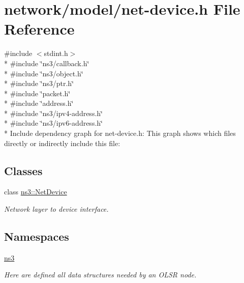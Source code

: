 \hypertarget{net-device_8h}{}\section{network/model/net-\/device.h File Reference}
\label{net-device_8h}
{\ttfamily \#include $<$stdint.\+h$>$}\\*
{\ttfamily \#include \char`\"{}ns3/callback.\+h\char`\"{}}\\*
{\ttfamily \#include \char`\"{}ns3/object.\+h\char`\"{}}\\*
{\ttfamily \#include \char`\"{}ns3/ptr.\+h\char`\"{}}\\*
{\ttfamily \#include \char`\"{}packet.\+h\char`\"{}}\\*
{\ttfamily \#include \char`\"{}address.\+h\char`\"{}}\\*
{\ttfamily \#include \char`\"{}ns3/ipv4-\/address.\+h\char`\"{}}\\*
{\ttfamily \#include \char`\"{}ns3/ipv6-\/address.\+h\char`\"{}}\\*
Include dependency graph for net-\/device.h\+:
This graph shows which files directly or indirectly include this file\+:
\subsection*{Classes}
\begin{DoxyCompactItemize}
\item 
class \hyperlink{classns3_1_1NetDevice}{ns3\+::\+Net\+Device}
\begin{DoxyCompactList}\small\item\em Network layer to device interface. \end{DoxyCompactList}\end{DoxyCompactItemize}
\subsection*{Namespaces}
\begin{DoxyCompactItemize}
\item 
 \hyperlink{namespacens3}{ns3}
\begin{DoxyCompactList}\small\item\em Here are defined all data structures needed by an O\+L\+SR node. \end{DoxyCompactList}\end{DoxyCompactItemize}
